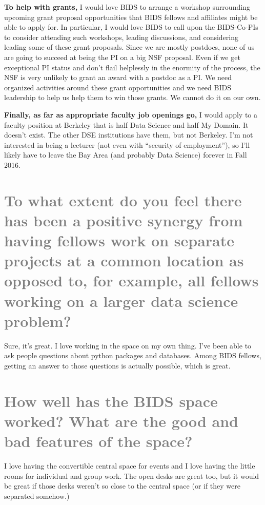 \documentclass[a4paper, 10pt]{article}
\begin{document}
\textbf{To help with grants,} I would love BIDS to arrange a workshop
surrounding upcoming grant proposal opportunities that BIDS fellows and
affiliates might be able to apply for. In particular, I would love BIDS to call
upon the BIDS-Co-PIs to consider attending such workshops, leading discussions,
and considering leading some of these grant proposals. Since we are mostly
postdocs, none of us are going to succeed at being the PI on a big NSF
proposal. Even if we get exceptional PI status and don't flail helplessly in
the enormity of the process, the NSF is very unlikely to grant an award with a
postdoc as a PI. We need organized activities around these grant opportunities
and we need BIDS leadership to help us help them to win those grants. We cannot
do it on our own.

\textbf{Finally, as far as appropriate faculty job openings go,} I would apply
to a faculty position at Berkeley that is half Data Science and half My Domain.
It doesn't exist. The other DSE institutions have them, but not Berkeley. I'm
not interested in being a lecturer (not even with ``security of employment''), so
I’ll likely have to leave the Bay Area (and probably Data Science) forever in
Fall 2016.


\section{\textcolor{gray}{To what extent do you feel there has been a positive
synergy from having fellows work on separate projects at a common location as
opposed to, for example, all fellows working on a larger data science
problem?}}

Sure, it’s great. I love working in the space on my own thing. I’ve been able
to ask people questions about python packages and databases. Among BIDS
fellows, getting an answer to those questions is actually possible, which is
great.

\section{\textcolor{gray}{How well has the BIDS space worked? What are the good
and bad features of the space?}}

I love having the convertible central space for events and I love having the
little rooms for individual and group work. The open desks are great too, but
it would be great if those desks weren't so close to the central space (or if
they were separated somehow.)
\end{document}
